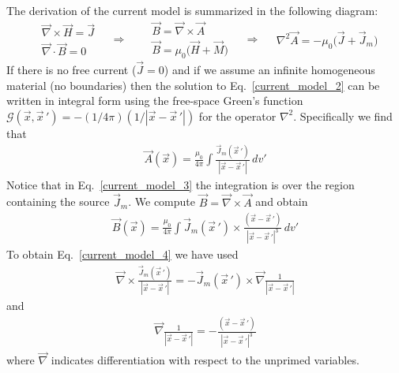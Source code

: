 \documentclass[11pt,a4paper,oneside]{book}
\numberwithin{equation}{section}
\newcommand{\abs}[1]{\left|#1\right|}
\theoremstyle{it}
\theoremstyle{definition}
\begin{document}
The derivation of the current model is summarized in the following diagram:
\begin{equation*}
	\boxed{\begin{aligned}
			& \vec{\nabla}\times\vec{H} = \vec{J} \\[8pt]
			& \vec{\nabla}\cdot\vec{B} = 0
	\end{aligned}} \quad\Rightarrow\quad
	\boxed{\begin{aligned}
			& \vec{B} = \vec{\nabla}\times\vec{A} \\[8pt]
			& \vec{B} = \mu_0\Big(\vec{H}+\vec{M}\Big) 
	\end{aligned}}\quad\Rightarrow\quad
	\boxed{\begin{aligned}
		\nabla^2\vec{A}=-\mu_0\Big(\vec{J}+\vec{J}_m\Big)
	\end{aligned}}
\end{equation*}
If there is no free current ($\vec{J}=0$) and if we assume an infinite homogeneous material (no boundaries) then  the solution to Eq.~\eqref{current_model_2} can be written in integral form using the free-space Green's function $\mathcal{G}(\vec{x},\vec{x}\,') = -(1/4\pi)(1/\abs{\vec{x}-\vec{x}\,'})$ for the operator $\nabla^2$. Specifically we find that 
 \begin{equation}\label{current_model_3}
 	\begin{aligned}
 		\vec{A}(\vec{x})=\frac{\mu_0}{4\pi}\int\frac{\vec{J}_m(\vec{x}\,')}{\abs{\vec{x}-\vec{x}\,'}}\,dv'
 	\end{aligned}
 \end{equation}
Notice that in Eq.~\eqref{current_model_3} the integration is over the region containing the source $\vec{J}_m$. We compute $\vec{B}=\vec{\nabla}\times\vec{A}$ and obtain 
 \begin{equation}\label{current_model_4}
	\begin{aligned}
		\vec{B}(\vec{x})=\frac{\mu_0}{4\pi}\int\vec{J}_m(\vec{x}\,')\times\frac{(\vec{x}-\vec{x}\,')}{\abs{\vec{x}-\vec{x}\,'}^3}\,dv'
	\end{aligned}
\end{equation}
To obtain Eq.~\eqref{current_model_4} we have used
 \begin{equation*}\label{}
	\begin{aligned}
		\vec{\nabla}\times\frac{\vec{J}_m(\vec{x}\,')}{\abs{\vec{x}-\vec{x}\,'}}=-\vec{J}_m(\vec{x}\,')\times\vec{\nabla}\frac{1}{\abs{\vec{x}-\vec{x}\,'}}
	\end{aligned}
\end{equation*}
and
 \begin{equation*}\label{}
	\begin{aligned}
		\vec{\nabla}\frac{1}{\abs{\vec{x}-\vec{x}\,'}} = -\frac{(\vec{x}-\vec{x}\,')}{\abs{\vec{x}-\vec{x}\,'}^3}
	\end{aligned}
\end{equation*}
where $\vec{\nabla}$ indicates differentiation with respect to the unprimed variables. 
\end{document}
